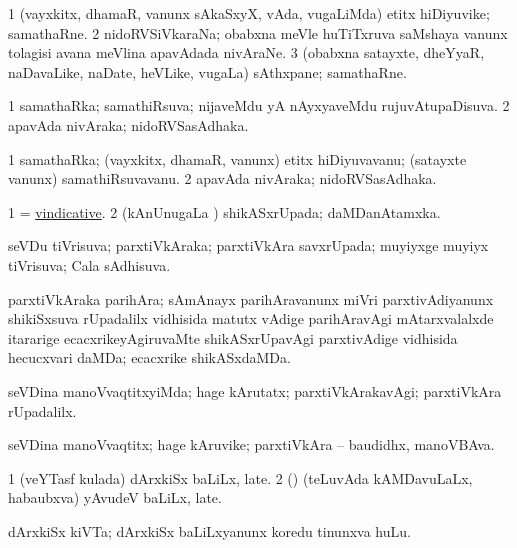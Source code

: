 \bentry
{} 
\gl{\nA}
\expl{}
\bmng
\bnum
\num{1} (vayxkitx, dhamaR, \mo vanunx sAkaSxyX, vAda, \mo vugaLiMda) etitx hiDiyuvike; samathaRne. 
\num{2} nidoRVSiVkaraNa; obabxna meVle huTiTxruva saMshaya \mo vanunx tolagisi avana meVlina apavAdada nivAraNe. 
\num{3} (obabxna satayxte, dheYyaR, naDavaLike, naDate, heVLike, \mo vugaLa) sAthxpane; samathaRne. 
\enum
\emng
\eentry

\bentry
{} 
\gl{\gu}
\expl{}
\bmng
\bnum
\num{1} samathaRka; samathiRsuva; nijaveMdu yA nAyxyaveMdu rujuvAtupaDisuva. 
\num{2} apavAda nivAraka; nidoRVSasAdhaka. 
\enum
\emng
\eentry

\bentry
{} 
\gl{\nA}
\expl{}
\bmng
\bnum
\num{1} samathaRka; (vayxkitx, dhamaR, \mo vanunx) etitx hiDiyuvavanu; (satayxte \mo vanunx) samathiRsuvavanu. 
\num{2} apavAda nivAraka; nidoRVSasAdhaka. 
\enum
\emng
\eentry

\bentry
{} 
\gl{\gu}
\expl{}
\bmng
\bnum
\num{1} = \hyperlink{vindicative}{vindicative}. 
\num{2} (kAnUnugaLa \vi) shikASxrUpada; daMDanAtamxka. 
\enum
\emng
\eentry

\bentry
{} 
\gl{\gu}
\expl{}
\bmng
 seVDu tiVrisuva; parxtiVkAraka; parxtiVkAra savxrUpada; muyiyxge muyiyx tiVrisuva; Cala sAdhisuva. 
\emng
\eentry

\bentry
{}
\gl{\nA}
\expl{}
\bmng
 parxtiVkAraka parihAra; sAmAnayx parihAravanunx miVri parxtivAdiyanunx shikiSxsuva rUpadalilx vidhisida matutx vAdige parihAravAgi mAtarxvalalxde itararige ecacxrikeyAgiruvaMte shikASxrUpavAgi parxtivAdige vidhisida hecucxvari daMDa; ecacxrike shikASxdaMDa. 
\emng
\eentry

\bentry
{} 
\gl{\kirxvi}
\expl{}
\bmng
 seVDina manoVvaqtitxyiMda; hage kArutatx; parxtiVkArakavAgi; parxtiVkAra rUpadalilx. 
\emng
\eentry

\bentry
{} 
\gl{\nA}
\expl{}
\bmng
 seVDina manoVvaqtitx; hage kAruvike; parxtiVkAra -- baudidhx, manoVBAva. 
\emng
\eentry

\bentry
{} 
\gl{\nA}
\expl{}
\bmng
\bnum
\num{1} (veYTasf kulada) dArxkiSx baLiLx, late. 
\num{2} (\ame) (teLuvAda kAMDavuLaLx, habaubxva) yAvudeV baLiLx, late. 
\enum
\emng
\eentry

\bentry
{} 
\gl{\nA}
\expl{}
\bmng
 dArxkiSx kiVTa; dArxkiSx baLiLxyanunx koredu tinunxva huLu. 
\emng
\eentry

